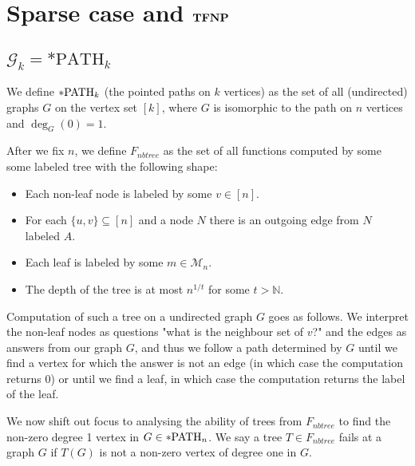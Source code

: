 \chapter{Sparse case and $\textbf{TFNP}$}

\section{$\mathcal{G}_k=*\text{PATH}_k$}

\begin{defi}
We define $*\text{PATH}_k$ (the pointed paths on $k$ vertices) as the set of all (undirected) graphs $G$ on the vertex set $[k]$, where $G$ is isomorphic to the path on $n$ vertices and $\deg_G(0)=1$.
\end{defi}

\begin{defi}
After we fix $n$, we define $F_{nbtree}$ as the set of all functions computed by some some labeled tree with the following shape:

\begin{itemize}
\item Each non-leaf node is labeled by some $v\in[n]$. 
\item For each $\{u,v\} \subseteq [n]$ and a node $N$ there is an outgoing edge from $N$ labeled $A$.
\item Each leaf is labeled by some $m\in \mathcal{M}_n$.
\item The depth of the tree is at most $n^{1/t}$ for some $t>\mathbb{N}$.
\end{itemize}

Computation of such a tree on a undirected graph $G$ goes as follows. We interpret the non-leaf nodes as questions "what is the neighbour set of $v$?" and the edges as answers from our graph $G$, and thus we follow a path determined by $G$ until we find a vertex for which the answer is not an edge (in which case the computation returns $0$) or until we find a leaf, in which case the computation returns the label of the leaf.
\end{defi}

We now shift out focus to analysing the ability of trees from $F_{nbtree}$ to find the non-zero degree 1 vertex in $G\in *\text{PATH}_n$. We say a tree $T\in F_{nbtree}$ fails at a graph $G$ if $T(G)$ is not a non-zero vertex of degree one in $G$.

